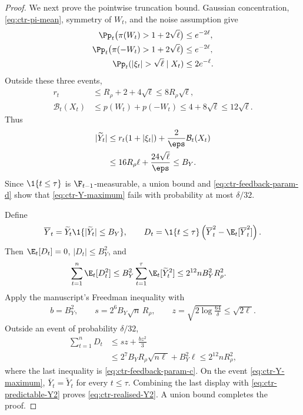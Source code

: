 \begin{proof}
    We next prove the pointwise truncation bound.  Gaussian concentration,
    \eqref{eq:ctr-pi-mean}, symmetry of $W_t$, and the noise assumption give
    \begin{align}
        \Pp_t\bigl(\pi(W_t)>1+2\sqrt\ell\bigr)  & \leq e^{-2\ell},
        \\
        \Pp_t\bigl(\pi(-W_t)>1+2\sqrt\ell\bigr) & \leq e^{-2\ell},
        \\
        \Pp_t(|\xi_t|>\sqrt\ell\mid X_t)        & \leq2e^{-\ell}.
        \label{eq:ctr-roundwise-tail-events}
    \end{align}
    Outside these three events,
    \begin{align}
        r_t
         & \leq R_\rho+2+4\sqrt\ell
        \leq8R_\rho\sqrt\ell,
        \\
        \mathcal B_t(X_t)
         & \leq p(W_t)+p(-W_t)
        \leq4+8\sqrt\ell
        \leq12\sqrt\ell.
    \end{align}
    Thus
    \begin{align}
        |\widetilde Y_t|
         & \leq r_t(1+|\xi_t|)+\frac2\eps\mathcal B_t(X_t)
        \\
         & \leq16R_\rho\ell+\frac{24\sqrt\ell}{\eps}
        \leq B_Y.
        \label{eq:ctr-Y-pointwise}
    \end{align}
    Since $\1\{t\leq\tau\}$ is $\F_{t-1}$-measurable, a union bound and
    \eqref{eq:ctr-feedback-param-d} show that
    \eqref{eq:ctr-Y-maximum} fails with probability at most $\delta/32$.

    Define
    \begin{align}
        \overline Y_t
        =\widetilde Y_t\1\{|\widetilde Y_t|\leq B_Y\},
        \qquad
        D_t=\1\{t\leq\tau\}
        \left(
        \overline Y_t^2-\E_t[\overline Y_t^2]
        \right).
    \end{align}
    Then $\E_t[D_t]=0$, $|D_t|\leq B_Y^2$, and
    \begin{align}
        \sum_{t=1}^n\E_t[D_t^2]
         & \leq B_Y^2
        \sum_{t=1}^{\tau}\E_t[\widetilde Y_t^2]
        \leq2^{12}nB_Y^2R_\rho^2.
    \end{align}
    Apply the manuscript's Freedman inequality with
    \begin{align}
        b=B_Y^2,
        \qquad
        s=2^6B_Y\sqrt n\,R_\rho,
        \qquad
        z=\sqrt{2\log\frac{64}{\delta}}\leq\sqrt{2\ell}.
    \end{align}
    Outside an event of probability $\delta/32$,
    \begin{align}
        \sum_{t=1}^nD_t
         & \leq sz+\frac{bz^2}{3}
        \\
         & \leq2^7B_YR_\rho\sqrt{n\ell}+B_Y^2\ell
        \leq2^{12}nR_\rho^2,
    \end{align}
    where the last inequality is
    \eqref{eq:ctr-feedback-param-c}.  On the event
    \eqref{eq:ctr-Y-maximum}, $\overline Y_t=\widetilde Y_t$ for every
    $t\leq\tau$.  Combining the last display with
    \eqref{eq:ctr-predictable-Y2} proves
    \eqref{eq:ctr-realised-Y2}.  A union bound completes the proof.
\end{proof}

